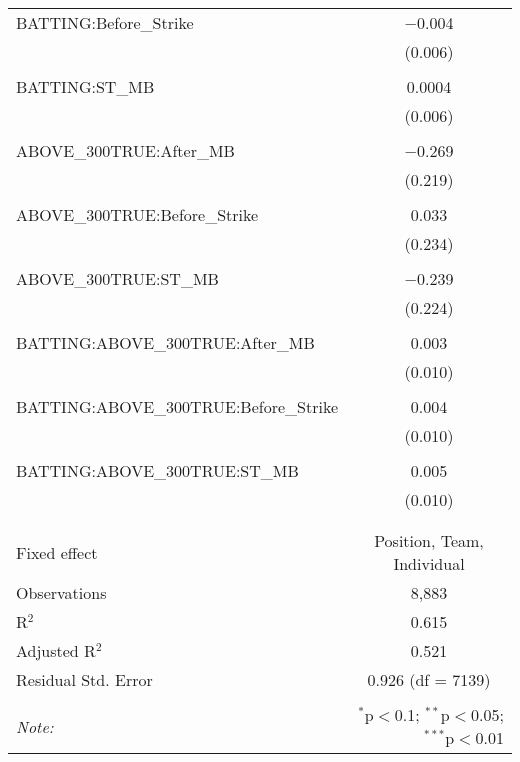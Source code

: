 \begin{table}[!htbp]
\begin{tabular}{@{\extracolsep{5pt}}lc}
 BATTING:Before\_Strike & $-$0.004 \\
  & (0.006) \\
  & \\
 BATTING:ST\_MB & 0.0004 \\
  & (0.006) \\
  & \\
 ABOVE\_300TRUE:After\_MB & $-$0.269 \\
  & (0.219) \\
  & \\
 ABOVE\_300TRUE:Before\_Strike & 0.033 \\
  & (0.234) \\
  & \\
 ABOVE\_300TRUE:ST\_MB & $-$0.239 \\
  & (0.224) \\
  & \\
 BATTING:ABOVE\_300TRUE:After\_MB & 0.003 \\
  & (0.010) \\
  & \\
 BATTING:ABOVE\_300TRUE:Before\_Strike & 0.004 \\
  & (0.010) \\
  & \\
 BATTING:ABOVE\_300TRUE:ST\_MB & 0.005 \\
  & (0.010) \\
  & \\
\hline \\[-1.8ex]
Fixed effect & Position, Team, Individual \\
Observations & 8,883 \\
R$^{2}$ & 0.615 \\
Adjusted R$^{2}$ & 0.521 \\
Residual Std. Error & 0.926 (df = 7139) \\
\hline
\hline \\[-1.8ex]
\textit{Note:}  & \multicolumn{1}{r}{$^{*}$p$<$0.1; $^{**}$p$<$0.05; $^{***}$p$<$0.01} \\
\end{tabular}
\end{table}
